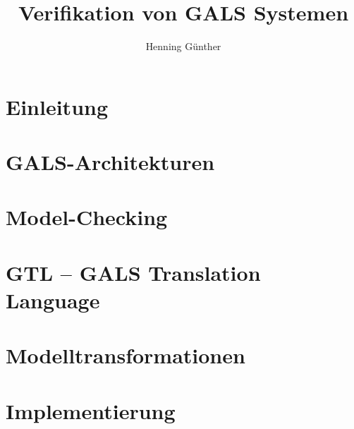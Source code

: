 \documentclass[10pt]{scrbook}
\title{Verifikation von GALS Systemen}
\author{Henning Günther}
\begin{document}
\maketitle

\tableofcontents

\chapter{Einleitung}

\chapter{GALS-Architekturen}

\chapter{Model-Checking}


\chapter{GTL -- GALS Translation Language}

\chapter{Modelltransformationen}



\chapter{Implementierung}







\end{document}
